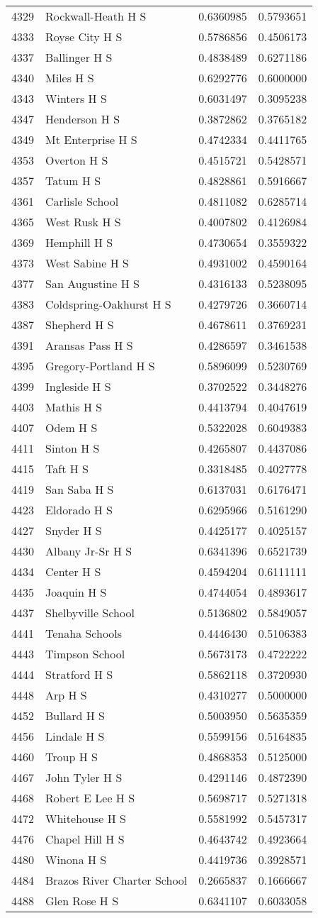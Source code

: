 \documentclass[
]{article}
\begin{document}
\begin{longtable}[]{@{}llrr@{}}
4329 & Rockwall-Heath H S & 0.6360985 & 0.5793651\tabularnewline
4333 & Royse City H S & 0.5786856 & 0.4506173\tabularnewline
4337 & Ballinger H S & 0.4838489 & 0.6271186\tabularnewline
4340 & Miles H S & 0.6292776 & 0.6000000\tabularnewline
4343 & Winters H S & 0.6031497 & 0.3095238\tabularnewline
4347 & Henderson H S & 0.3872862 & 0.3765182\tabularnewline
4349 & Mt Enterprise H S & 0.4742334 & 0.4411765\tabularnewline
4353 & Overton H S & 0.4515721 & 0.5428571\tabularnewline
4357 & Tatum H S & 0.4828861 & 0.5916667\tabularnewline
4361 & Carlisle School & 0.4811082 & 0.6285714\tabularnewline
4365 & West Rusk H S & 0.4007802 & 0.4126984\tabularnewline
4369 & Hemphill H S & 0.4730654 & 0.3559322\tabularnewline
4373 & West Sabine H S & 0.4931002 & 0.4590164\tabularnewline
4377 & San Augustine H S & 0.4316133 & 0.5238095\tabularnewline
4383 & Coldspring-Oakhurst H S & 0.4279726 & 0.3660714\tabularnewline
4387 & Shepherd H S & 0.4678611 & 0.3769231\tabularnewline
4391 & Aransas Pass H S & 0.4286597 & 0.3461538\tabularnewline
4395 & Gregory-Portland H S & 0.5896099 & 0.5230769\tabularnewline
4399 & Ingleside H S & 0.3702522 & 0.3448276\tabularnewline
4403 & Mathis H S & 0.4413794 & 0.4047619\tabularnewline
4407 & Odem H S & 0.5322028 & 0.6049383\tabularnewline
4411 & Sinton H S & 0.4265807 & 0.4437086\tabularnewline
4415 & Taft H S & 0.3318485 & 0.4027778\tabularnewline
4419 & San Saba H S & 0.6137031 & 0.6176471\tabularnewline
4423 & Eldorado H S & 0.6295966 & 0.5161290\tabularnewline
4427 & Snyder H S & 0.4425177 & 0.4025157\tabularnewline
4430 & Albany Jr-Sr H S & 0.6341396 & 0.6521739\tabularnewline
4434 & Center H S & 0.4594204 & 0.6111111\tabularnewline
4435 & Joaquin H S & 0.4744054 & 0.4893617\tabularnewline
4437 & Shelbyville School & 0.5136802 & 0.5849057\tabularnewline
4441 & Tenaha Schools & 0.4446430 & 0.5106383\tabularnewline
4443 & Timpson School & 0.5673173 & 0.4722222\tabularnewline
4444 & Stratford H S & 0.5862118 & 0.3720930\tabularnewline
4448 & Arp H S & 0.4310277 & 0.5000000\tabularnewline
4452 & Bullard H S & 0.5003950 & 0.5635359\tabularnewline
4456 & Lindale H S & 0.5599156 & 0.5164835\tabularnewline
4460 & Troup H S & 0.4868353 & 0.5125000\tabularnewline
4467 & John Tyler H S & 0.4291146 & 0.4872390\tabularnewline
4468 & Robert E Lee H S & 0.5698717 & 0.5271318\tabularnewline
4472 & Whitehouse H S & 0.5581992 & 0.5457317\tabularnewline
4476 & Chapel Hill H S & 0.4643742 & 0.4923664\tabularnewline
4480 & Winona H S & 0.4419736 & 0.3928571\tabularnewline
4484 & Brazos River Charter School & 0.2665837 &
0.1666667\tabularnewline
4488 & Glen Rose H S & 0.6341107 & 0.6033058\tabularnewline

\end{longtable}
\end{document}
